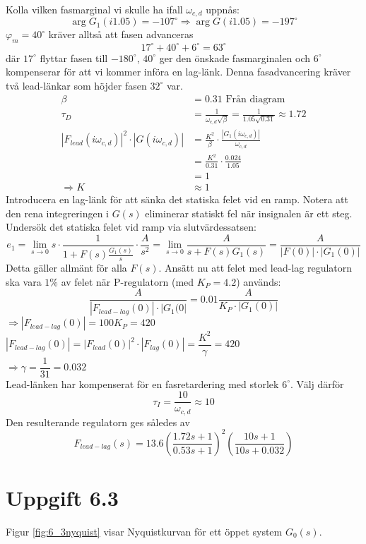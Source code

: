 \documentclass[12pt]{article}
\begin{document}
Kolla vilken fasmarginal vi skulle ha ifall $\omega_{c,d}$ uppnås: 
\[\arg{G_1(i1.05)} = -107 ^{\circ} \Rightarrow \arg{G(i1.05)} = -197 ^{\circ}\]
$\varphi_m = 40 ^{\circ}$ kräver alltså att fasen advanceras 
\[17 ^{\circ} + 40 ^{\circ} + 6 ^{\circ} = 63 ^{\circ}\]
där $17 ^{\circ}$ flyttar fasen till $-180 ^{\circ}$, $40 ^{\circ}$ ger den önskade fasmarginalen och $6 ^{\circ}$ kompenserar för att vi kommer införa en lag-länk. Denna fasadvancering kräver två lead-länkar som höjder fasen $32 ^{\circ}$ var.
\begin{align*}
  \beta &= 0.31 \text{ Från diagram} \\
  \tau_D &= \frac{1}{\omega_{c,d}\sqrt{\beta}} = \frac{1}{1.05\sqrt{0.31}} \approx 1.72 \\ 
  |F_{lead}(i\omega_{c,d})|^2\cdot|G(i\omega_{c,d})| &= \frac{K^2}{\beta}\cdot \frac{|G_1(i\omega_{c,d})|}{\omega_{c,d}} \\
                                                     &= \frac{K^2}{0.31}\cdot \frac{0.024}{1.05} \\
                                                     &= 1 \\
  \Rightarrow K &\approx 1
\end{align*}
Introducera en lag-länk för att sänka det statiska felet vid en ramp. Notera att den rena integreringen i $G(s)$ eliminerar statiskt fel när insignalen är ett steg. Undersök det statiska felet vid ramp via slutvärdessatsen: 
\[e_1 = \lim_{s \to 0}s \cdot \frac{1}{1 + F(s) \frac{G_1(s)}{s}}\cdot \frac{A}{s^2} = \lim_{s \to 0} \frac{A}{s + F(s)G_1(s)} = \frac{A}{|F(0)|\cdot|G_1(0)|}\]
Detta gäller allmänt för alla $F(s)$. Ansätt nu att felet med lead-lag regulatorn ska vara $1\%$ av felet när P-regulatorn (med $K_P = 4.2$) används: 
\[\frac{A}{|F_{lead-lag}(0)|\cdot|G_1(0|} = 0.01\frac{A}{K_P\cdot |G_1(0)|}\]
$\Rightarrow |F_{lead-lag}(0)| = 100K_P = 420$ \\
$|F_{lead-lag}(0)| = |F_{lead}(0)|^2\cdot|F_{lag}(0)| = \dfrac{K^2}{\gamma} = 420$ \\
$\Rightarrow \gamma = \dfrac{1}{31} = 0.032$ \\

Lead-länken har kompenserat för en fasretardering med storlek $6 ^{\circ}$. Välj därför 
\[\tau_I = \frac{10}{\omega_{c,d}} \approx 10\]
Den resulterande regulatorn ges således av 
\[F_{lead-lag}(s) = 13.6 \left(\frac{1.72s+1}{0.53s+1}\right)^2 \left( \frac{10s+1}{10s+0.032}\right)\]

\section*{Uppgift 6.3}
Figur \ref{fig:6_3nyquist} visar Nyquistkurvan för ett öppet system $G_0(s)$.
\end{document}
